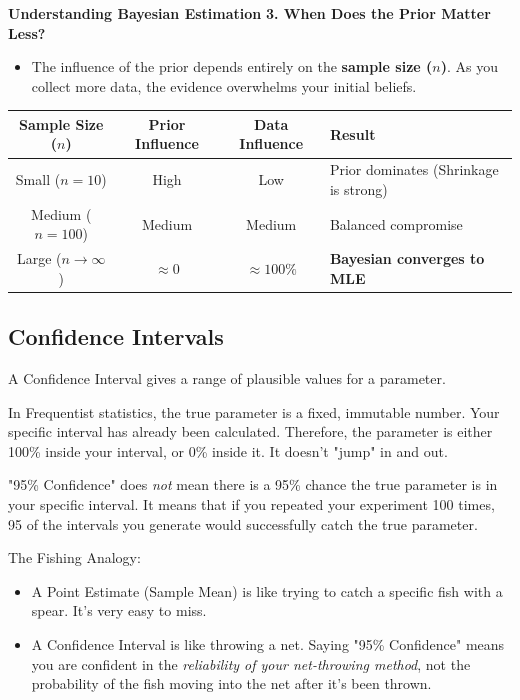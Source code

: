 \begin{example}{\textbf{Understanding Bayesian Estimation}}
\vspace{0.3cm}
\textbf{3. When Does the Prior Matter Less?}
\begin{itemize}
    \item The influence of the prior depends entirely on the \textbf{sample size ($n$)}. As you collect more data, the evidence overwhelms your initial beliefs.
\end{itemize}

\begin{center}
\renewcommand{\arraystretch}{1.2}
\begin{tabular}{|c|c|c|l|}
\hline
\textbf{Sample Size ($n$)} & \textbf{Prior Influence} & \textbf{Data Influence} & \textbf{Result} \\
\hline
Small ($n=10$) & High & Low & Prior dominates (Shrinkage is strong) \\
Medium ($n=100$) & Medium & Medium & Balanced compromise \\
Large ($n \to \infty$) & $\approx 0$ & $\approx 100\%$ & \textbf{Bayesian converges to MLE} \\
\hline
\end{tabular}
\end{center}

\end{example}

\pagebreak




\subsection{Confidence Intervals}
A Confidence Interval gives a range of plausible values for a parameter. 

 In Frequentist statistics, the true parameter is a fixed, immutable number. Your specific interval has already been calculated. Therefore, the parameter is either 100\% inside your interval, or 0\% inside it. It doesn't "jump" in and out.
 
 "95\% Confidence" does \textit{not} mean there is a 95\% chance the true parameter is in your specific interval. It means that if you repeated your experiment 100 times, 95 of the intervals you generate would successfully catch the true parameter.

 \begin{defbox}{The Fishing Analogy:} 
\begin{itemize}
    \item A Point Estimate (Sample Mean) is like trying to catch a specific fish with a spear. It's very easy to miss.
    \item A Confidence Interval is like throwing a net. Saying "95\% Confidence" means you are confident in the \textit{reliability of your net-throwing method}, not the probability of the fish moving into the net after it's been thrown.
\end{itemize}
\end{defbox}

